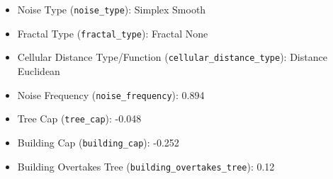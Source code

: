 \begin{itemize}
    \item Noise Type (\verb|noise_type|): Simplex Smooth
    \item Fractal Type (\verb|fractal_type|): Fractal None
    \item Cellular Distance Type/Function (\verb|cellular_distance_type|): Distance Euclidean
    \item Noise Frequency (\verb|noise_frequency|): 0.894
    \item Tree Cap (\verb|tree_cap|): -0.048
    \item Building Cap (\verb|building_cap|): -0.252
    \item Building Overtakes Tree (\verb|building_overtakes_tree|): 0.12
\end{itemize}